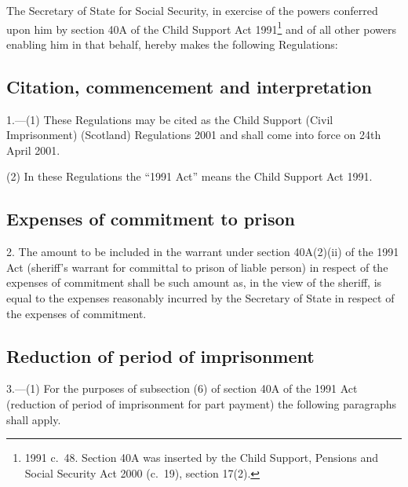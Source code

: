 \documentclass[12pt,a4paper]{article}
\title{\regstitle}
\author{S.I.\ 2001 No.\ 1236 (S. 3)}
\date{Made
27th March 2001\\
Laid before Parliament
3rd April 2001\\
Coming into force
24th April 2001
}
\begin{document}
\maketitle

\noindent
The Secretary of State for Social Security, in exercise of the powers conferred upon him by section 40A of the Child Support Act 1991\footnote{1991 c.\ 48. Section 40A was inserted by the Child Support, Pensions and Social Security Act 2000 (c.\ 19), section 17(2).} and of all other powers enabling him in that behalf, hereby makes the following Regulations: 

{\sloppy

\tableofcontents

}

\bigskip

\setcounter{secnumdepth}{-2}

\subsection[1. Citation, commencement and interpretation]{Citation, commencement and interpretation}

1.---(1)  These Regulations may be cited as the Child Support (Civil Imprisonment) (Scotland) Regulations 2001 and shall come into force on 24th April 2001.

(2) In these Regulations the “1991 Act” means the Child Support Act 1991.

\subsection[2. Expenses of commitment to prison]{Expenses of commitment to prison}

2.  The amount to be included in the warrant under section 40A(2)(ii) of the 1991 Act (sheriff’s warrant for committal to prison of liable person) in respect of the expenses of commitment shall be such amount as, in the view of the sheriff, is equal to the expenses reasonably incurred by the Secretary of State in respect of the expenses of commitment.

\subsection[3. Reduction of period of imprisonment]{Reduction of period of imprisonment}

3.---(1)  For the purposes of subsection (6) of section 40A of the 1991 Act (reduction of period of imprisonment for part payment) the following paragraphs shall apply.
\end{document}

